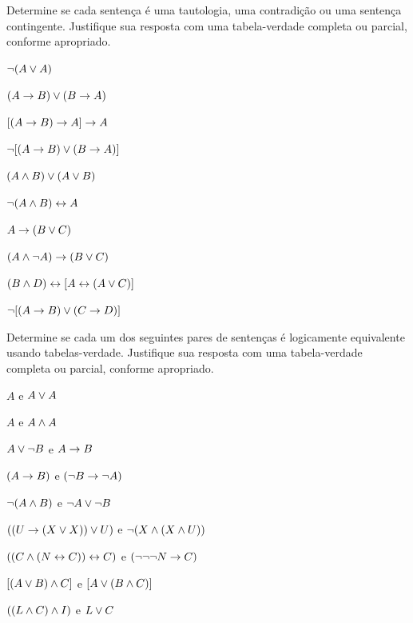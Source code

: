 \noindent\problempart
\label{pr.TT.TTorC4}
Determine se cada sentença é uma tautologia, uma contradição ou uma sentença contingente. Justifique sua resposta com uma tabela-verdade completa ou parcial, conforme apropriado.
\begin{compactlist}
\item  $\neg (A \vee A)$\vspace{.5ex}							%
\item $(A \rightarrow B) \vee (B \rightarrow A)$\vspace{.5ex}					%
\item $[(A \rightarrow B) \rightarrow A] \rightarrow A$\vspace{.5ex}					%
\item $\neg[( A \rightarrow B) \vee (B \rightarrow A)]$\vspace{.5ex}			%
\item $(A \wedge B) \vee (A \vee B)$\vspace{.5ex} 				%
\item $\neg(A\wedge B) \leftrightarrow A$\vspace{.5ex} 					%
\item $A\rightarrow(B\vee C)$\vspace{.5ex} 							%
\item $(A \wedge\neg A) \rightarrow (B \vee C)$\vspace{.5ex} 			%
\item $(B\wedge D) \leftrightarrow [A \leftrightarrow(A \vee C)]$\vspace{.5ex}			%
\item $\neg[(A \rightarrow B) \vee (C \rightarrow D)]$\vspace{.5ex} 			%
\end{compactlist}



\noindent\problempart
Determine se cada um dos seguintes pares de sentenças é logicamente equivalente usando tabelas-verdade. Justifique sua resposta com uma tabela-verdade completa ou parcial, conforme apropriado.
\begin{compactlist}
\item $A$ e $A \vee A$
\item $A$ e $A \wedge A$
\item $A \vee \neg B$ e $A\rightarrow B$
\item $(A \rightarrow B)$ e $(\neg B \rightarrow \neg A)$
\item $\neg(A \wedge B)$ e $\neg A \vee \neg B$
\item $ ((U \rightarrow (X \vee X)) \vee U)$ e $\neg (X \wedge (X \wedge U))$
\item $ ((C \wedge (N \leftrightarrow C)) \leftrightarrow C)$ e $(\neg \neg \neg N \rightarrow C)$
\item $[(A \vee B) \wedge C]$ e $[A \vee (B \wedge C)]$
\item $((L \wedge C) \wedge I)$ e $L \vee C$
\end{compactlist}


